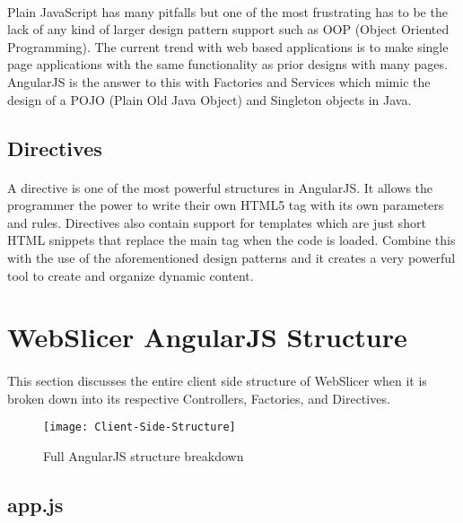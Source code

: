 \paragraph{}
Plain JavaScript has many pitfalls but one of the most frustrating has to be the lack of any kind of larger design pattern support such as OOP (Object Oriented Programming).
The current trend with web based applications is to make single page applications with the same functionality as prior designs with many pages.
AngularJS is the answer to this with Factories and Services which mimic the design of a POJO (Plain Old Java Object) and Singleton objects in Java.

\subsection{Directives}
\paragraph{}
A directive is one of the most powerful structures in AngularJS.
It allows the programmer the power to write their own HTML5 tag with its own parameters and rules.
Directives also contain support for templates which are just short HTML snippets that replace the main tag when the code is loaded.
Combine this with the use of the aforementioned design patterns and it creates a very powerful tool to create and organize dynamic content.

\section{WebSlicer AngularJS Structure}
\paragraph{}
This section discusses the entire client side structure of WebSlicer when it is broken down into its respective Controllers, Factories, and Directives.
\begin{figure}[!ht]
  \centering
  \texttt{[image: Client-Side-Structure]}
  \caption{Full AngularJS structure breakdown}
  \label{fig:client-side-structure}
\end{figure}

\subsection{app.js}%
